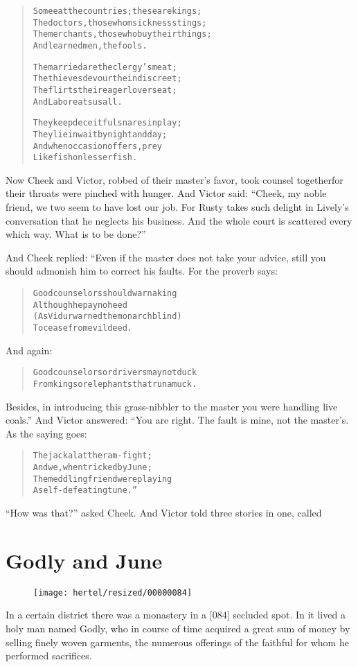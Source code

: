 \documentclass[article, twoside, 10pt]{memoir}
\renewenvironment{verbatim}{%
\begin{quote}%
\vskip -10pt%
\begin{alltt}\normalfont\small}{\end{alltt}%
\end{quote}%
\vskip -10pt
} %
\begin{document}
\begin{verbatim}
Some eat the countries; these are kings;
The doctors, those whom sickness stings;
The merchants, those who buy their things;
And learned men, the fools.

The married are the clergy's meat;
The thieves devour the indiscreet;
The flirts their eager lovers eat;
And Labor eats us all.

They keep deceitful snares in play;
They lie in wait by night and day;
And when occasion offers, prey
Like fish on lesser fish.
\end{verbatim}
Now Cheek and Victor, robbed of their master's favor, took counsel
together{\textemdash}for their throats were pinched with hunger. And Victor
said:
``Cheek, my noble friend, we two seem to have lost our job. For Rusty takes such delight in Lively's conversation that he neglects his business. And the whole court is scattered every which way. What is to be done?''

And Cheek replied: “Even if the master does not take your advice,
still you should admonish him to correct his faults. For the
proverb says:

\begin{verbatim}
Good counselors should warn a king
    Although he pay no heed
(As Vidur warned the monarch blind)
    To cease from evil deed.
\end{verbatim}
And again:

\begin{verbatim}
Good counselors or drivers may not duck
From kings or elephants that run amuck.
\end{verbatim}
Besides, in introducing this grass-nibbler to the master you were
handling live coals.” And Victor answered: “You are right. The
fault is mine, not the master's. As the saying goes:

\begin{verbatim}
The jackal at the ram-fight;
    And we, when tricked by June;
The meddling friend{\textemdash}were playing
    A self-defeating tune.”
\end{verbatim}
``How was that?'' asked Cheek. And Victor told three stories in
one, called

\chapter{Godly and June}

\begin{figure}[p]\texttt{[image: hertel/resized/00000084]}\end{figure}In a certain district there was a monastery in a [084] secluded
spot. In it lived a holy man named Godly, who in course of time
acquired a great sum of money by selling finely woven garments, the
numerous offerings of the faithful for whom he performed
sacrifices.
\end{document}
